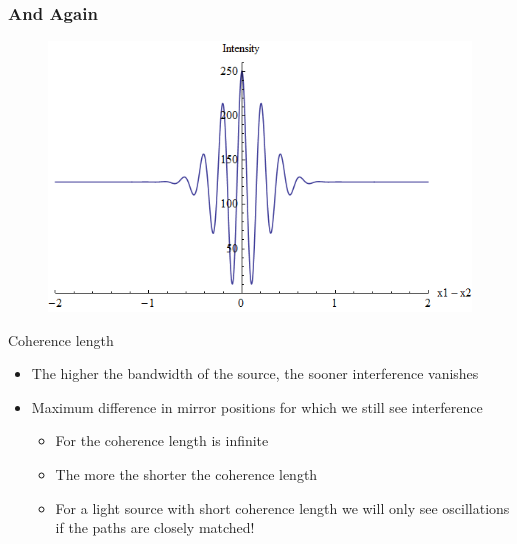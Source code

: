 \begin{frame}
    \frametitle{And Again}

    \begin{figure}
        \includegraphics[height=0.65\textheight]{figures/Interference4.png}
    \end{figure}

\end{frame}


\begin{frame}[c]{Coherence length}
    \begin{itemize}
        \setlength\itemsep{0.3cm}
        \item<1->  The higher the bandwidth of the source, the sooner interference vanishes
        \item<2->  Maximum difference in mirror positions for which we still see interference
              \vspace{0.3cm}
              \begin{itemize}
                  \setlength\itemsep{0.2cm}
                  \item<3-> For  the coherence length is infinite
                  \item<4-> The more  the shorter the coherence length
                  \item<5-> For a light source with short coherence length we will only see oscillations if the paths are closely matched!
              \end{itemize}
    \end{itemize}

\end{frame}



